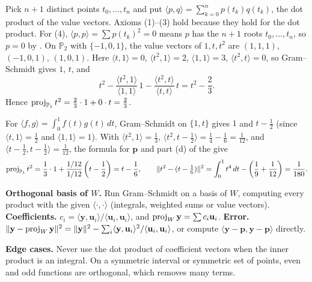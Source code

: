 \documentclass[10pt]{scrartcl}
\newcommand{\vv}[1]{\mathbf{#1}}
\newcommand{\ip}[2]{\langle #1,#2\rangle}
\newenvironment{howto}[1]{\begin{mdframed}[style=howtostyle,frametitle={#1}]}{\end{mdframed}}
\begin{document}
\begin{example*}
  Pick $n+1$ distinct points $t_0,\dots,t_n$ and put $\ip{p}{q}=\sum_{k=0}^n p(t_k)q(t_k)$, the dot product of the value vectors. Axioms (1)--(3) hold because they hold for the dot product. For (4), $\ip{p}{p}=\sum p(t_k)^2=0$ means $p$ has the $n+1$ roots $t_0,\dots,t_n$, so $p=0$ by . On $\mathbb P_2$ with $\{-1,0,1\}$, the value vectors of $1,t,t^2$ are $(1,1,1)$, $(-1,0,1)$, $(1,0,1)$. Here $\ip{t}{1}=0$, $\ip{t^2}{1}=2$, $\ip11=3$, $\ip{t^2}{t}=0$, so Gram--Schmidt gives $1$, $t$, and
  \[
    t^2-\frac{\ip{t^2}{1}}{\ip11}\,1-\frac{\ip{t^2}{t}}{\ip tt}\,t=t^2-\frac23.
  \] Hence $\operatorname{proj}_{\mathbb P_1}t^2=\frac23\cdot 1+0\cdot t=\frac23$.
\end{example*}

\begin{example*}
  For $\ip{f}{g}=\int_0^1 f(t)g(t)\,dt$, Gram--Schmidt on $\{1,t\}$ gives $1$ and $t-\frac12$ (since $\ip{t}{1}=\frac12$ and $\ip11=1$). With $\ip{t^2}{1}=\frac13$, $\ip{t^2}{t-\frac12}=\frac14-\frac16=\frac{1}{12}$, and $\ip{t-\frac12}{t-\frac12}=\frac{1}{12}$, the formula for $\vv p$ and part (d) of the  give
  \[
    \operatorname{proj}_{\mathbb P_1}t^2 = \frac13\cdot 1 + \frac{1/12}{1/12}\left(t-\frac12\right) = t - \frac16,
    \qquad
    \|t^2-(t-\tfrac16)\|^2 = \int_0^1 t^4\,dt - \left(\frac19+\frac{1}{12}\right) = \frac{1}{180}.
  \]
\end{example*}

\begin{howto}{How to find a best approximation in an inner product space}
  \begin{steps}
    \ii \textbf{Orthogonal basis of $W$.} Run Gram--Schmidt on a basis of $W$, computing every product with the given $\ip{\cdot}{\cdot}$ (integrals, weighted sums or value vectors).
    \ii \textbf{Coefficients.} $c_i=\ip{\vv y}{\vv u_i}/\ip{\vv u_i}{\vv u_i}$, and $\proj_W\vv y=\sum c_i\vv u_i$.
    \ii \textbf{Error.} $\|\vv y-\proj_W\vv y\|^2=\|\vv y\|^2-\sum_i\ip{\vv y}{\vv u_i}^2/\ip{\vv u_i}{\vv u_i}$, or compute $\ip{\vv y-\vv p}{\vv y-\vv p}$ directly.
  \end{steps}
  \textbf{Edge cases.} Never use the dot product of coefficient vectors when the inner product is an integral. On a symmetric interval or symmetric set of points, even and odd functions are orthogonal, which removes many terms.
\end{howto}
\end{document}
